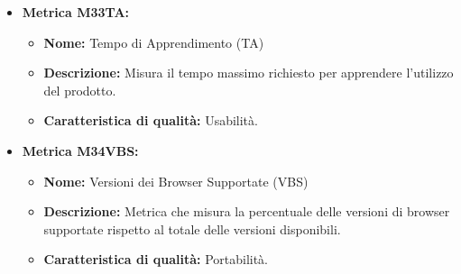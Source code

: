 \begin{itemize}
            \item \textbf{Metrica M33TA:}
                  \begin{itemize}
                      \item \textbf{Nome:} Tempo di Apprendimento (TA)
                      \item \textbf{Descrizione:} Misura il tempo massimo richiesto per apprendere l'utilizzo del prodotto.
                      \item \textbf{Caratteristica di qualità:} Usabilità.
                    \end{itemize}

            \item \textbf{Metrica M34VBS:}
                    \begin{itemize}
                        \item \textbf{Nome:} Versioni dei Browser Supportate (VBS)
                        \item \textbf{Descrizione:} Metrica che misura la percentuale delle versioni di browser supportate rispetto al totale delle versioni disponibili.
                        \item \textbf{Caratteristica di qualità:} Portabilità.
                      \end{itemize}

\end{itemize}